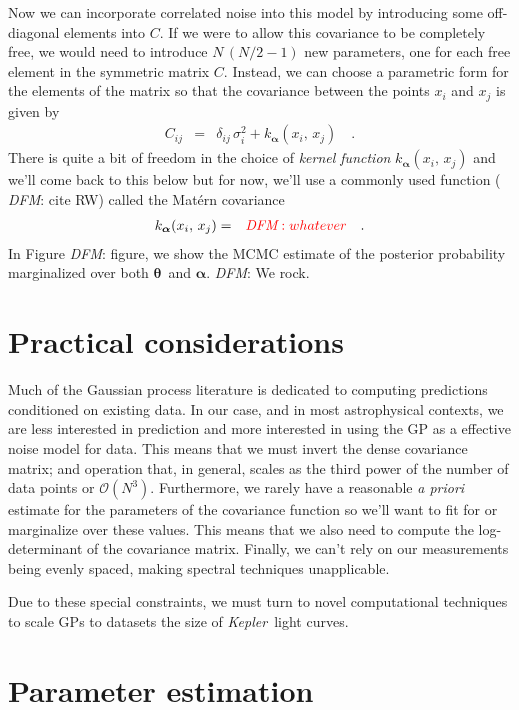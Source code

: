\documentclass[12pt,preprint]{aastex}
\newcommand{\project}[1]{{\emph{#1}}}
\newcommand{\kepler}{\project{Kepler}}
\newcommand{\foreign}[1]{\emph{#1}}
\newcommand{\sectlabel}[1]{\label{sect:#1}}
\newcommand{\todo}[3]{{\color{#2} \emph{#1}: #3}}
\newcommand{\dfmtodo}[1]{\todo{DFM}{red}{#1}}
\newcommand{\params}{{\ensuremath{\boldsymbol{\theta}}}}
\newcommand{\hyperpar}{{\ensuremath{\alpha}}}
\newcommand{\hyperpars}{{\ensuremath{\boldsymbol{\hyperpar}}}}
\begin{document}
Now we can incorporate correlated noise into this model by introducing some
off-diagonal elements into $C$.
If we were to allow this covariance to be completely free, we would need to
introduce $N\,(N/2-1)$ new parameters, one for each free element in the
symmetric matrix $C$.
Instead, we can choose a parametric form for the elements of the matrix so
that the covariance between the points $x_i$ and $x_j$ is given by
\begin{eqnarray}
C_{ij} &=& \delta_{ij}\,\sigma_i^2 + k_\hyperpars(x_i,\,x_j) \quad.
\end{eqnarray}
There is quite a bit of freedom in the choice of \emph{kernel function}
$k_\hyperpars(x_i,\,x_j)$ and we'll come back to this below but for now, we'll
use a commonly used function (\dfmtodo{cite RW}) called the Mat\'ern
covariance
\begin{eqnarray}
k_\hyperpars(x_i,\,x_j) &=& \dfmtodo{whatever} \quad.
\end{eqnarray}
In Figure \dfmtodo{figure}, we show the MCMC estimate of the posterior
probability marginalized over both \params\ and \hyperpars.
\dfmtodo{We rock.}


\section{Practical considerations}\sectlabel{practical}

Much of the Gaussian process literature is dedicated to computing predictions
conditioned on existing data.
In our case, and in most astrophysical contexts, we are less interested in
prediction and more interested in using the GP as a effective noise model for
data.
This means that we must invert the dense covariance matrix; and operation
that, in general, scales as the third power of the number of data points or
$\mathcal{O}(N^3)$.
Furthermore, we rarely have a reasonable \foreign{a priori} estimate for the
parameters of the covariance function so we'll want to fit for or marginalize
over these values.
This means that we also need to compute the log-determinant of the covariance
matrix.
Finally, we can't rely on our measurements being evenly spaced, making
spectral techniques unapplicable.

Due to these special constraints, we must turn to novel computational
techniques to scale GPs to datasets the size of \kepler\ light curves.


\section{Parameter estimation}\sectlabel{parameters}
\end{document}
